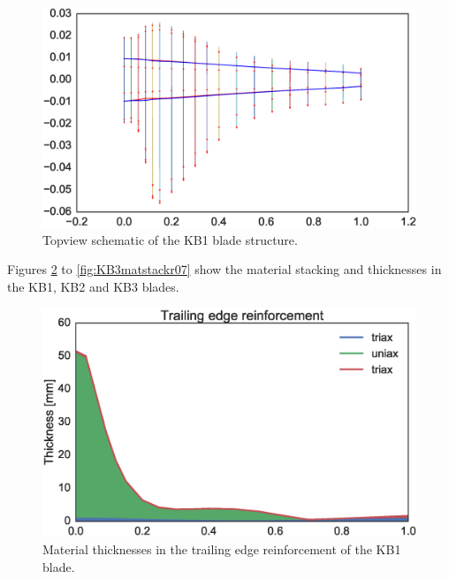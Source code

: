 \begin{figure}[!ht]
\begin{center}
	\includegraphics[width=.85\linewidth]{figures/KB1_topview.eps}
\end{center}
\caption{Topview schematic of the KB1 blade structure.}
\label{fig:topview}
\end{figure}

Figures \ref{fig:KB1matstackr01} to \ref{fig:KB3matstackr07} show the material stacking and thicknesses in the KB1, KB2 and KB3 blades.

\begin{figure}[!ht]
\begin{center}
	\includegraphics[width=.85\linewidth]{figures/KB1_region01.eps}
\end{center}
\caption{Material thicknesses in the trailing edge reinforcement of the KB1 blade.}
\label{fig:KB1matstackr01}
\end{figure}

